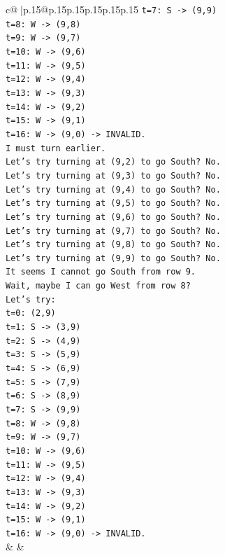 \documentclass{article}
\begin{document}
{\begin{supertabular}{c@{$\;$}|p{.15\linewidth}@{}p{.15\linewidth}p{.15\linewidth}p{.15\linewidth}p{.15\linewidth}p{.15\linewidth}}
{{{\texttt{t=7: S {-}> (9,9)} \\
\texttt{t=8: W {-}> (9,8)} \\
\texttt{t=9: W {-}> (9,7)} \\
\texttt{t=10: W {-}> (9,6)} \\
\texttt{t=11: W {-}> (9,5)} \\
\texttt{t=12: W {-}> (9,4)} \\
\texttt{t=13: W {-}> (9,3)} \\
\texttt{t=14: W {-}> (9,2)} \\
\texttt{t=15: W {-}> (9,1)} \\
\texttt{t=16: W {-}> (9,0) {-}> INVALID.} \\
\texttt{I must turn earlier.} \\
\texttt{Let's try turning at (9,2) to go South? No.} \\
\texttt{Let's try turning at (9,3) to go South? No.} \\
\texttt{Let's try turning at (9,4) to go South? No.} \\
\texttt{Let's try turning at (9,5) to go South? No.} \\
\texttt{Let's try turning at (9,6) to go South? No.} \\
\texttt{Let's try turning at (9,7) to go South? No.} \\
\texttt{Let's try turning at (9,8) to go South? No.} \\
\texttt{Let's try turning at (9,9) to go South? No.} \\
\texttt{It seems I cannot go South from row 9.} \\
\texttt{Wait, maybe I can go West from row 8?} \\
\texttt{Let's try:} \\
\texttt{t=0: (2,9)} \\
\texttt{t=1: S {-}> (3,9)} \\
\texttt{t=2: S {-}> (4,9)} \\
\texttt{t=3: S {-}> (5,9)} \\
\texttt{t=4: S {-}> (6,9)} \\
\texttt{t=5: S {-}> (7,9)} \\
\texttt{t=6: S {-}> (8,9)} \\
\texttt{t=7: S {-}> (9,9)} \\
\texttt{t=8: W {-}> (9,8)} \\
\texttt{t=9: W {-}> (9,7)} \\
\texttt{t=10: W {-}> (9,6)} \\
\texttt{t=11: W {-}> (9,5)} \\
\texttt{t=12: W {-}> (9,4)} \\
\texttt{t=13: W {-}> (9,3)} \\
\texttt{t=14: W {-}> (9,2)} \\
\texttt{t=15: W {-}> (9,1)} \\
\texttt{t=16: W {-}> (9,0) {-}> INVALID.} \\
            }
        }
    }
    & & \\ \\


\end{supertabular}}
\end{document}
